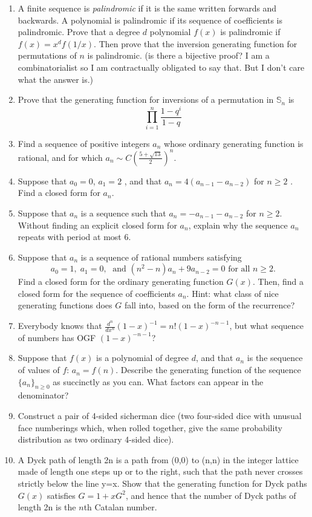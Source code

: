 \documentclass[12pt]{article}
\begin{document}
\begin{enumerate}
	\item A finite sequence is \emph{palindromic} if it is the same written forwards and backwards. A polynomial is palindromic if its sequence of coefficients is palindromic.  Prove that a degree $d$ polynomial $f(x)$ is palindromic if $f(x) = x^d f(1/x)$.  Then prove that the inversion generating function for permutations of $n$ is palindromic.  (is there a bijective proof? I am a combinatorialist so I am contractually obligated to say that. But I don't care what the answer is.)
	\item Prove that the generating function for inversions of a permutation in $\mathbb{S}_n$ is $$\prod_{i=1}^n \frac{1-q^i}{1-q}$$
	\item Find a sequence of positive integers $a_n$ whose ordinary generating function is rational, and for which $a_n \sim C \left( \frac{5+\sqrt{13}}{2}\right)^n$.
	\item Suppose that $a_0 = 0$,  $a_1 = 2$ , and that $a_{n} = 4(a_{n-1} - a_{n-2})$ for $n \geq 2$ .  Find a closed form for $a_n$.
	\item Suppose that $a_n$ is a sequence such that $a_n = -a_{n-1} - a_{n-2}$ for $n \geq 2$.  Without finding an explicit closed form for $a_n$, explain why the sequence $a_n$ repeats with period at most 6.
	\item Suppose that $a_n$ is a sequence of rational numbers satisfying $$a_0 = 1,\; a_1 =0,\; \text{ and } (n^2-n)a_{n} + 9a_{n-2} = 0 \text{ for all }n \geq 2.$$
Find a closed form for the ordinary generating function $G(x)$.  Then, find a closed form for the sequence of coefficients $a_n$.   Hint: what class of nice generating functions does $G$ fall into, based on the form of the recurrence?
	\item Everybody knows that $\frac{d^n}{dx^n}(1-x)^{-1} = n! (1-x)^{-n-1}$, but what sequence of numbers has OGF $(1-x)^{-n-1}$?
	\item Suppose that $f(x)$ is a polynomial of degree $d$, and that $a_n$ is the sequence of values of $f$:  $a_n = f(n)$.  Describe the generating function of the sequence $\{a_n\}_{n \geq 0}$ as succinctly as you can.  What factors can appear in the denominator?
	\item Construct a pair of 4-sided sicherman dice (two four-sided dice with unusual face numberings which, when rolled together, give the same probability distribution as two ordinary 4-sided dice).
	\item A Dyck path of length 2n is a path from (0,0) to (n,n) in the integer lattice made of length one steps up or to the right, such that the path never crosses strictly below the line y=x.  Show that the generating function for Dyck paths $G(x)$ satisfies $G = 1 + xG^2$, and hence that the number of Dyck paths of length 2n is the $n$th Catalan number.

\end{enumerate}
\end{document}
